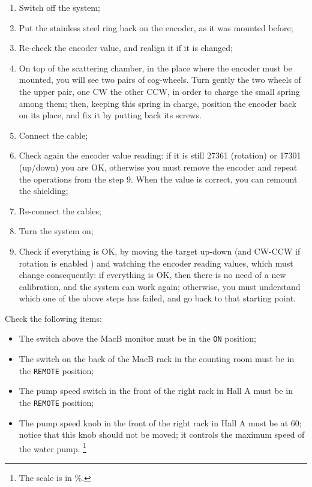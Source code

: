 \begin{enumerate}
	\footnote{One single encoder step error means an offset error  of 
	about 0.04 degrees, or 0.006 mm.}. If values do not match, then turn 
	MANUALLY the encoder axis, until the display value is at the desired 
	one. When done, you can remount the encoder on top of the scattering 
	chamber.
\item Switch off the system;
\item Put the stainless steel ring back on the encoder, as it was mounted 
	before;
\item Re-check the encoder value, and realign it if it is changed; 
\item On top of the scattering chamber, in the place where the encoder must 
	be mounted, you will see two pairs of cog-wheels. Turn gently the two
	wheels of the upper pair, one CW the other CCW, in order to 
	charge the small spring among them; then, keeping this spring in 
	charge, position the encoder back on its place, and fix it by putting 
	back its screws.
\item Connect the cable;
\item Check again the encoder value reading: if it is still 27361 (rotation) or
 	17301 (up/down) you  are OK, otherwise you must remove 
	the encoder and repeat the operations from  the step 9. 
	When the value is correct, you can remount the shielding; 
\item Re-connect the cables;
\item Turn the system on;
\item Check if everything is OK, by moving the target up-down (and CW-CCW if 
	rotation is enabled )
	and watching the encoder reading values, which must change 
	consequently: if everything is OK, then there is no need of a new 
	calibration, and the system can work again;  otherwise, you must 
	understand which one of the above steps has failed, and go back to 
	that starting point. 
\end{enumerate}


Check the following items:
\begin{itemize}
 \item The switch above the MacB monitor must be in the \verb.ON. position; 
 \item The switch on the back of the MacB rack in the counting room must be in 
	the \verb.REMOTE. position;
 \item The pump speed switch in the front of the right rack in
 	Hall A must be in the \verb.REMOTE. position;
 \item The pump speed knob in the front of the right rack in Hall
 	A must be at 60; notice that this knob should not be
 	moved; it controls the maximum speed of the water pump.
	 \footnote{The scale is in \%.} 
\end{itemize}
